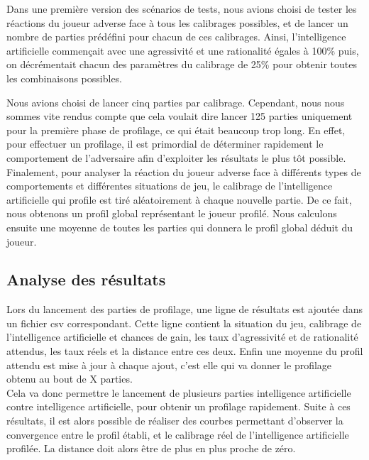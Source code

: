 \documentclass{report}
\begin{document}
Dans une première version des scénarios de tests, nous avions choisi de tester les réactions du joueur adverse face à tous les calibrages possibles, et de lancer un nombre de parties prédéfini pour chacun de ces calibrages. Ainsi, l'intelligence artificielle commençait avec une agressivité et une rationalité égales à 100\% puis, on décrémentait chacun des paramètres du calibrage de 25\% pour obtenir toutes les combinaisons possibles.\par
Nous avions choisi de lancer cinq parties par calibrage. Cependant, nous nous sommes vite rendus compte que cela voulait dire lancer 125 parties uniquement pour la première phase de profilage, ce qui était beaucoup trop long. En effet, pour effectuer un profilage, il est primordial de déterminer rapidement le comportement de l'adversaire afin d'exploiter les résultats le plus tôt possible.\\

Finalement, pour analyser la réaction du joueur adverse face à différents types de comportements et différentes situations de jeu, le calibrage de l'intelligence artificielle qui profile est tiré aléatoirement à chaque nouvelle partie. De ce fait, nous obtenons un profil global représentant le joueur profilé. Nous calculons ensuite une moyenne de toutes les parties qui donnera le profil global déduit du joueur.

\subsection{Analyse des résultats}

\hspace{0.5cm}Lors du lancement des parties de profilage, une ligne de résultats est ajoutée dans un fichier csv correspondant. Cette ligne contient la situation du jeu, calibrage de l'intelligence artificielle et chances de gain, les taux d'agressivité et de rationalité attendus, les taux réels et la distance entre ces deux. Enfin une moyenne du profil attendu est mise à jour à chaque ajout, c'est elle qui va donner le profilage obtenu au bout de X parties.\\

Cela va donc permettre le lancement de plusieurs parties intelligence artificielle contre intelligence artificielle, pour obtenir un profilage rapidement. Suite à ces résultats, il est alors possible de réaliser des courbes permettant d'observer la convergence entre le profil établi, et le calibrage réel de l'intelligence artificielle profilée. La distance doit alors être de plus en plus proche de zéro.\\
\end{document}
